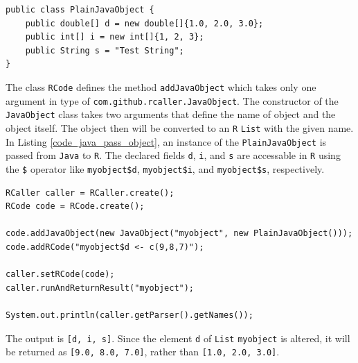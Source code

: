 \documentclass[10pt,a4paper, final, oneside]{article}
\begin{document}
\begin{minipage}{\linewidth}
\begin{lstlisting}[caption=A Plain Java Object Class,label=code_java_simple_object]
public class PlainJavaObject {
    public double[] d = new double[]{1.0, 2.0, 3.0};
    public int[] i = new int[]{1, 2, 3};
    public String s = "Test String";
}
\end{lstlisting}
\end{minipage}

The class \texttt{RCode} defines the method \texttt{addJavaObject} which takes only one argument in type of \texttt{com.github.rcaller.JavaObject}. The constructor of the \texttt{JavaObject} class takes two arguments that define the name of object and the object itself. The object then will be converted to an \texttt{R} \texttt{List} with the given name. In Listing \ref{code_java_pass_object}, an instance of the \texttt{PlainJavaObject} is passed from \texttt{Java} to \texttt{R}. The declared fields \texttt{d}, \texttt{i}, and \texttt{s} are accessable in \texttt{R} using the \texttt{\$} operator like \texttt{myobject\$d}, \texttt{myobject\$i}, and \texttt{myobject\$s}, respectively.

\begin{minipage}{\linewidth}
\begin{lstlisting}[caption=Passing Java Objects,label=code_java_pass_object]
RCaller caller = RCaller.create();
RCode code = RCode.create();

code.addJavaObject(new JavaObject("myobject", new PlainJavaObject()));
code.addRCode("myobject$d <- c(9,8,7)");

caller.setRCode(code);
caller.runAndReturnResult("myobject");

System.out.println(caller.getParser().getNames());
\end{lstlisting}
\end{minipage}

The output is \texttt{[d, i, s]}. Since the element \texttt{d} of \texttt{List} \texttt{myobject} is altered, it will be returned as \texttt{[9.0, 8.0, 7.0]}, rather than \texttt{[1.0, 2.0, 3.0]}.
\end{document}

